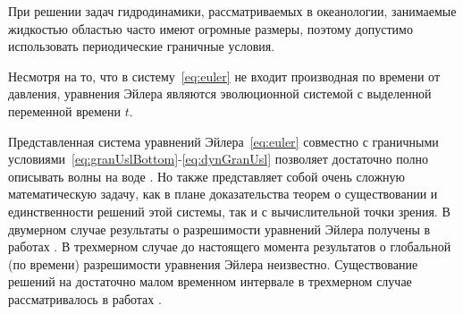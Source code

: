 При решении задач гидродинамики, рассматриваемых в океанологии, занимаемые жидкостью областью часто имеют огромные размеры, поэтому допустимо использовать периодические граничные условия.

Несмотря на то, что в систему~\eqref{eq:euler} не входит
производная по времени от давления, уравнения Эйлера являются
эволюционной системой с выделенной переменной времени $t$.

%

Представленная система уравнений Эйлера~\eqref{eq:euler} совместно с граничными условиями~\eqref{eq:granUslBottom}-\eqref{eq:dynGranUsl} позволяет достаточно полно описывать волны на воде \cite{Sretensky}. Но также представляет собой очень сложную
математическую задачу, как в плане доказательства теорем о
существовании и единственности решений этой системы, так и с
вычислительной точки зрения. В двумерном случае результаты о
разрешимости уравнений Эйлера получены в работах \cite{Udo,Kato}.
В трехмерном случае до настоящего момента результатов о глобальной
(по времени) разрешимости уравнения Эйлера неизвестно.
Существование решений на достаточно малом временном интервале в
трехмерном случае рассматривалось в работах \cite{Gunter,Lich}.

